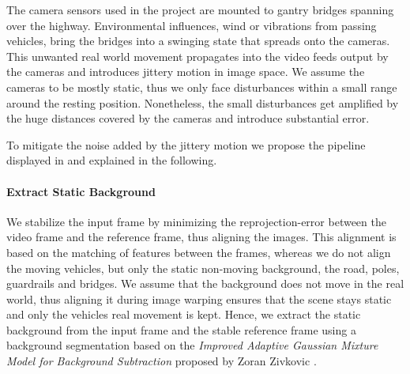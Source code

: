The camera sensors used in the project are mounted to gantry bridges spanning over the highway.
Environmental influences, \eg{} wind or vibrations from passing vehicles, bring the bridges into a swinging state that spreads onto the cameras. 
This unwanted real world movement propagates into the video feeds output by the cameras and introduces jittery motion in image space. 
We assume the cameras to be mostly static, thus we only face disturbances within a small range around the resting position.
Nonetheless, the small disturbances get amplified by the huge distances covered by the cameras and introduce substantial error.

To mitigate the noise added by the jittery motion we propose the pipeline displayed in  and explained in the following.


\paragraph{Extract Static Background}
We stabilize the input frame by minimizing the reprojection-error between the video frame and the reference frame, thus aligning the images.
This alignment is based on the matching of features between the frames, whereas we do not align the moving vehicles, but only the static non-moving background, \eg{} the road, poles, guardrails and bridges.
We assume that the background does not move in the real world, thus aligning it during image warping ensures that the scene stays static and only the vehicles real movement is kept.
Hence, we extract the static background from the input frame and the stable reference frame using a background segmentation based on
the \emph{Improved Adaptive Gaussian Mixture Model for Background Subtraction} proposed by Zoran Zivkovic \etal{} \cite{zivkovic10.5555/1018428.1020644,zivkovic10.1016/j.patrec.2005.11.005,opencv_library}.



